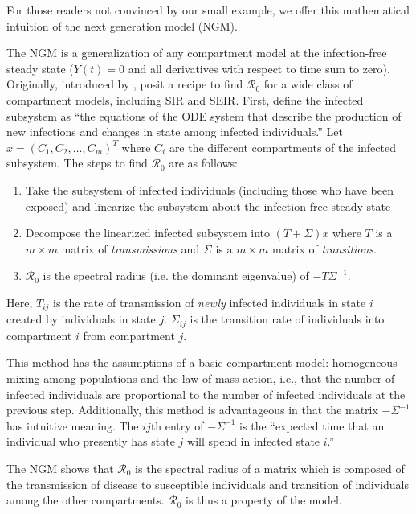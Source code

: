 \documentclass[12pt]{article}
\newcommand{\rr}{\ensuremath{\mathcal{R}_0}}
\begin{document}
For those readers not convinced by our small example, we offer this mathematical intuition of the next generation model (NGM).

 The NGM is a generalization of any compartment model at the infection-free steady state ($Y(t)=0$ and all derivatives with respect to time sum to zero). Originally, introduced by \citep{diekmann1990}, \cite{diekmann2009} posit a recipe to find $\rr$ for a wide class of compartment models, including SIR and SEIR. First, define the infected subsystem as ``the equations of the ODE system that describe the production of new infections and changes in state among infected individuals.''  Let $x = (C_1, C_2, \dots, C_m)^T$ where $C_i$ are the different compartments of the infected subsystem.  The steps to find $\rr$ are as follows:


\begin{enumerate}
\item Take the subsystem of infected individuals (including those who have been exposed) and linearize the subsystem about the infection-free steady state
\item Decompose the linearized infected subsystem into $(T + \Sigma )x$ where $T$ is a $m\times m$ matrix of \textit{transmissions} and $\Sigma$ is a $m \times m$ matrix of \textit{transitions}.
\item $\rr$ is the spectral radius (i.e. the dominant eigenvalue) of $-T \Sigma^{-1}$.  
\end{enumerate}

Here, $T_{ij}$ is the rate of transmission of \textit{newly} infected individuals in state $i$ created by individuals in state $j$.  $\Sigma_{ij}$ is the transition rate of individuals into compartment $i$ from compartment $j$.

This method has the assumptions of a basic compartment model: homogeneous mixing among populations and the law of mass action, i.e., that the number of infected individuals are proportional to the number of infected individuals at the previous step.   Additionally, this method is advantageous in that the matrix $-\Sigma^{-1}$ has intuitive meaning.  The $ij$th entry of $- \Sigma^{-1}$ is the ``expected time that an individual who presently has state $j$ will spend in infected state $i$.''

The NGM shows that $\rr$ is the spectral radius of a matrix which is composed of the transmission of disease to susceptible individuals and transition of individuals among the other compartments.  $\rr$ is thus a property of the model.
\end{document}
